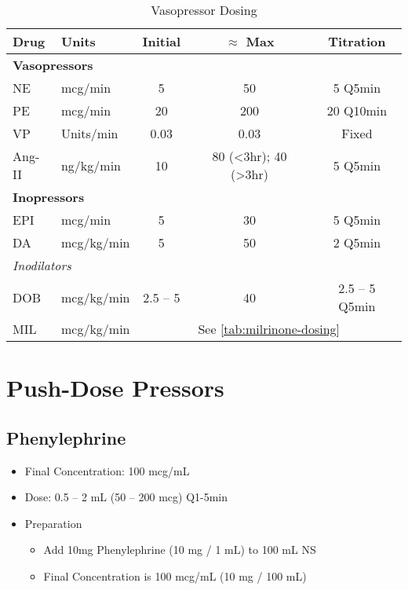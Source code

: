 \documentclass[main.tex]{subfiles}
\begin{document}
\begin{table*}[hbt]
\centering
\caption{Vasopressor Dosing \autocite{overgaardInotropesVasopressorsReview2008a,jentzerPharmacotherapyUpdateUse2015b}}
\label{tab:vasopressor-dosing}
\begin{tabular}{l l c c c}
	\textbf{Drug} & \textbf{Units} & \textbf{Initial} & \textbf{$\mathbf{\approx}$ Max} & \textbf{Titration}\\ \hline
	\multicolumn{5}{l}{\textbf{Vasopressors}} \\
	NE & \si{mcg/min} & 5 & 50 & 5 Q5min \\
	PE & \si{mcg/min} &  20 & 200 & 20 Q10min \\
	VP & \si{Units/min} & 0.03 & 0.03 & Fixed \\
	Ang-II & \si{ng/kg/min} & 10 & 80 (\textless 3hr); 40 (\textgreater 3hr)& 5 Q5min \\
	\multicolumn{5}{l}{\textbf{Inopressors}}\\
	EPI & \si{mcg/min} & 5 & 30 & 5 Q5min \\
	DA & \si{mcg/kg/min} & 5 & 50 & 2 Q5min\\
	\multicolumn{5}{l}{\textit{Inodilators}}\\
	DOB & \si{mcg/kg/min} & 2.5 -- 5 & 40 & 2.5 -- 5 Q5min \\
	MIL & \si{mcg/kg/min} & \multicolumn{3}{c}{See \autoref{tab:milrinone-dosing}} \\
\end{tabular}
\end{table*}

\section{Push-Dose Pressors \autocite{weingartPushdosePressorsImmediate2015a}}
\subsection{Phenylephrine}
\begin{itemize}[noitemsep]
	\item Final Concentration: 100 \si{mcg/mL}
	\item Dose: 0.5 -- 2 \si{mL} (50 -- 200 \si{mcg}) Q1-5min
	\item Preparation
	\begin{itemize}[noitemsep]
		\item Add 10\si{mg} Phenylephrine (10 \si{mg} / 1 \si{mL}) to 100 \si{mL} NS
		\item Final Concentration is 100 \si{mcg/mL} (10 \si{mg} / 100 \si{mL})
	\end{itemize}
\end{itemize}
\end{document}
